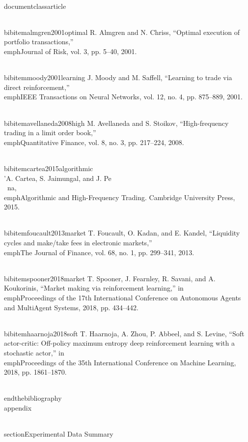 \\documentclass{article}
\begin{document}
\\bibitem{almgren2001optimal}
R. Almgren and N. Chriss, ``Optimal execution of portfolio transactions,'' \\emph{Journal of Risk}, vol. 3, pp. 5--40, 2001.

\\bibitem{moody2001learning}
J. Moody and M. Saffell, ``Learning to trade via direct reinforcement,'' \\emph{IEEE Transactions on Neural Networks}, vol. 12, no. 4, pp. 875--889, 2001.

\\bibitem{avellaneda2008high}
M. Avellaneda and S. Stoikov, ``High-frequency trading in a limit order book,'' \\emph{Quantitative Finance}, vol. 8, no. 3, pp. 217--224, 2008.

\\bibitem{cartea2015algorithmic}
{\\'{A}}. Cartea, S. Jaimungal, and J. Pe{\\~{n}}a, \\emph{Algorithmic and High-Frequency Trading}. Cambridge University Press, 2015.

\\bibitem{foucault2013market}
T. Foucault, O. Kadan, and E. Kandel, ``Liquidity cycles and make/take fees in electronic markets,'' \\emph{The Journal of Finance}, vol. 68, no. 1, pp. 299--341, 2013.

\\bibitem{spooner2018market}
T. Spooner, J. Fearnley, R. Savani, and A. Koukorinis, ``Market making via reinforcement learning,'' in \\emph{Proceedings of the 17th International Conference on Autonomous Agents and MultiAgent Systems}, 2018, pp. 434--442.

\\bibitem{haarnoja2018soft}
T. Haarnoja, A. Zhou, P. Abbeel, and S. Levine, ``Soft actor-critic: Off-policy maximum entropy deep reinforcement learning with a stochastic actor,'' in \\emph{Proceedings of the 35th International Conference on Machine Learning}, 2018, pp. 1861--1870.

\\end{thebibliography}
\n\n
\\appendix

\\section{Experimental Data Summary}
\end{document}
